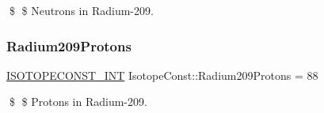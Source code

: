 \$ \$ Neutrons in Radium-\/209. \mbox{\label{group___isotope_const-_radium-_ra209_gac5ae9c18e18fef5122a823f21009addb}} 
\subsubsection{\texorpdfstring{Radium209\+Protons}{Radium209Protons}}
{\footnotesize\ttfamily \mbox{\hyperlink{group___isotope_const-_macros_ga5f18360b3e99483a35c32d789e62621c}{I\+S\+O\+T\+O\+P\+E\+C\+O\+N\+S\+T\+\_\+\+I\+NT}} Isotope\+Const\+::\+Radium209\+Protons = 88}

\$ \$ Protons in Radium-\/209. 